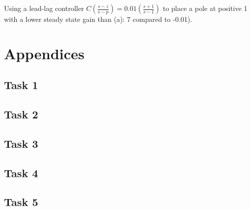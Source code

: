 \documentclass[a4paper,11pt]{article}
\begin{document}
Using a lead-lag controller $C(\frac{s-z}{s-p}) = 0.01(\frac{s+1}{s-1})$ to place a pole at positive 1 with a lower steady state gain than (a): 7 compared to -0.01).

\newpage
\section*{Appendices}
\subsection*{Task 1}

\subsection*{Task 2}

\newpage
\subsection*{Task 3}

\subsection*{Task 4}

\newpage
\subsection*{Task 5}

\end{document}
